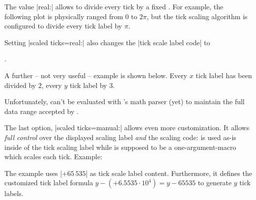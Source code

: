 \begin{pgfplotsxykeylist}
	The value |real:| allows to divide every tick by a fixed .
	For example, the following plot is physically ranged from $0$ to $2\pi$, but the tick scaling algorithm is configured to divide every tick label by $\pi$.
\begin{codeexample}[]
\end{codeexample}
	\noindent Setting |scaled ticks=real:| also changes the |tick scale label code| to
\begin{codeexample}
.
\end{codeexample}

A further -- not very useful -- example is shown below. Every $x$ tick label has been divided by $2$, every $y$ tick label by $3$.
\nobreak
\begin{codeexample}[]
\end{codeexample}

	Unfortunately,  can't be evaluated with \PGF's math parser (yet) to maintain the full data range accepted by \PGFPlots.

	The last option, |scaled ticks=manual:| allows even more customization. It allows \emph{full control} over the displayed scaling label \emph{and} the scaling code:  is used as-is inside of the tick scaling label while  is supposed to be a one-argument-macro which scales each tick. Example:
\begin{codeexample}[]
\end{codeexample}
\noindent The example uses |$+65\,535$| as tick scale label content. Furthermore, it defines the customized tick label formula $y - (+6.5535\cdot 10^4) = y - 65535$ to generate $y$ tick labels.


\end{pgfplotsxykeylist}

